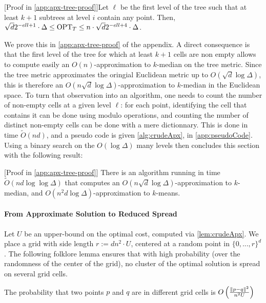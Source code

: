 \begin{lemma}\label{lem:apxTree}
[Proof in \cref{app:apx-tree-proof}]Let $\ell$ be the first level of the tree such that at least $k+1$ subtrees at level $i$ contain any point. Then, $\sqrt{d}2^{-ell+1} \cdot \Delta \leq
\text{OPT}_T \leq n \cdot \sqrt{d}2^{-ell+4} \cdot \Delta$.
\end{lemma}

We prove this in \cref{app:apx-tree-proof} of the appendix. A direct consequence  is that the first level of the tree for which at least
$k+1$ cells are non empty allows to compute easily an $O(n)$-approximation to $k$-median on the tree metric. Since the tree metric approximates the oringial Euclidean metric up to $O(\sqrt{d} \log \Delta)$, this is therefore an $O(n \sqrt{d} \log \Delta)$-approximation to $k$-median in the Euclidean space.
 To turn that observation into an algorithm, one needs to count the number of non-empty cells at a given level $\ell$: for each point, identifying the cell that contains it can be done using modulo operations, and counting the number of distinct non-empty cells can be done with a mere dictionnary.
This is done in time $\tilde O(nd)$, and a pseudo code is given \cref{alg:crudeApx}, in \cref{app:pseudoCode}.  Using a binary search on the $O(\log \Delta)$ many levels then concludes this section with the following result:

\begin{lemma}\label{lem:crudeApx}[Proof in \cref{app:apx-tree-proof}]
There is an algorithm running in time $\tilde O(nd \log \log \Delta)$ that computes an $O(n \sqrt{d} \log \Delta)$-approximation to $k$-median, and $O(n^2 d \log \Delta)$-approximation to $k$-means.
\end{lemma}




\paragraph*{From Approximate Solution to Reduced Spread}


Let $U$ be an upper-bound on the optimal cost, computed via \cref{lem:crudeApx}. We place a grid with side length $r:= d n^2\cdot U$, centered at a random point in $\{0, ..., r\}^d$.
The following folklore lemma ensures that with high probability (over the randomness of the center of the grid), no cluster of the optimal solution is spread on several grid cells.

\begin{lemma}
The probability that two points $p$ and $q$ are in different grid cells is $O\left( \frac{\|p-q\|^2}{n^2 U}\right)$
\end{lemma}

